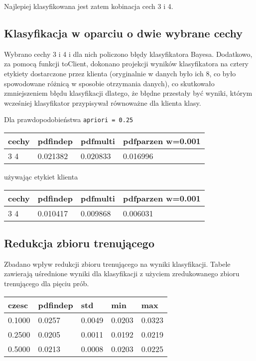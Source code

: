 \documentclass[11pt]{article}
\begin{document}
Najlepiej klasyfikowana jest zatem kobinacja cech 3 i 4.

\subsection{Klasyfikacja w oparciu o dwie wybrane
cechy}\label{klasyfikacja-w-oparciu-o-dwie-wybrane-cechy}

Wybrano cechy 3 i 4 i dla nich policzono błędy klasyfikatora Bayesa.
Dodatkowo, za pomocą funkcji toClient, dokonano projekcji wyników
klasyfikatora na cztery etykiety dostarczone przez klienta (oryginalnie
w danych było ich 8, co było spowodowane różnicą w sposobie otrzymania
danych), co skutkowało zmniejszeniem błędu klasyfikacji dlatego, że
błędne przestały być wyniki, którym wcześniej klasyfikator przypisywał
równoważne dla klienta klasy.

Dla prawdopodobieństwa \texttt{apriori\ =\ 0.25}

\begin{longtable}[]{@{}llll@{}}
\toprule
cechy & pdfindep & pdfmulti & pdfparzen w=0.001\tabularnewline
\midrule
\endhead
3 4 & 0.021382 & 0.020833 & 0.016996\tabularnewline
\bottomrule
\end{longtable}

używając etykiet klienta

\begin{longtable}[]{@{}llll@{}}
\toprule
cechy & pdfindep & pdfmulti & pdfparzen w=0.001\tabularnewline
\midrule
\endhead
3 4 & 0.010417 & 0.009868 & 0.006031\tabularnewline
\bottomrule
\end{longtable}

\subsection{Redukcja zbioru
trenującego}\label{redukcja-zbioru-trenujux105cego}

Zbadano wpływ redukcji zbioru trenującego na wyniki klasyfikacji. Tabele
zawierają uśrednione wyniki dla klasyfikacji z użyciem zredukowanego
zbioru trenującego dla pięciu prób.

\begin{longtable}[]{@{}lllll@{}}
\toprule
czesc & pdfindep & std & min & max\tabularnewline
\midrule
\endhead
0.1000 & 0.0257 & 0.0049 & 0.0203 & 0.0323\tabularnewline
0.2500 & 0.0205 & 0.0011 & 0.0192 & 0.0219\tabularnewline
0.5000 & 0.0213 & 0.0008 & 0.0203 & 0.0225\tabularnewline
\bottomrule
\end{longtable}
\end{document}
